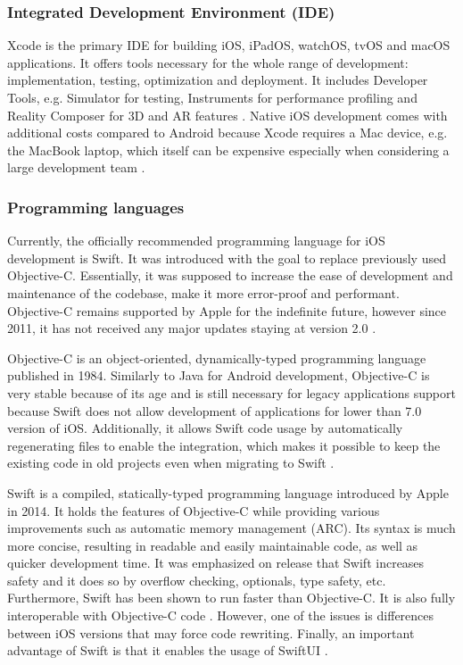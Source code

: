 \subsubsection*{Integrated Development Environment (IDE)}

Xcode is the primary IDE for building iOS, iPadOS, watchOS, tvOS and macOS applications. It offers tools necessary for the whole range of development: implementation, testing, optimization and deployment. It includes Developer Tools, e.g. Simulator for testing, Instruments for performance profiling and Reality Composer for 3D and AR features \cite{xcode_documentation}. Native iOS development comes with additional costs compared to Android because Xcode requires a Mac device, e.g. the MacBook laptop, which itself can be expensive especially when considering a large development team \cite{comparison_technologies_multiplatform,comp_study_hybrid}.

\subsubsection*{Programming languages}

Currently, the officially recommended programming language for iOS development is Swift. It was introduced with the goal to replace previously used Objective-C. Essentially, it was supposed to increase the ease of development and maintenance of the codebase, make it more error-proof and performant. Objective-C remains supported by Apple for the indefinite future, however since 2011, it has not received any major updates staying at version 2.0 \cite{swift_overview,speed_performance_swift_objective_c,swift_vs_objective_c,wiki_objective_c}.

Objective-C is an object-oriented, dynamically-typed programming language published in 1984. Similarly to Java for Android development, Objective-C is very stable because of its age and is still necessary for legacy applications support because Swift does not allow development of applications for lower than 7.0 version of iOS. Additionally, it allows Swift code usage by automatically regenerating files to enable the integration, which makes it possible to keep the existing code in old projects even when migrating to Swift \cite{swift_objective_c_new_language,geeks_objective_c_swift}.

Swift is a compiled, statically-typed programming language introduced by Apple in 2014. It holds the features of Objective-C while providing various improvements such as automatic memory management (ARC). Its syntax is much more concise, resulting in readable and easily maintainable code, as well as quicker development time. It was emphasized on release that Swift increases safety and it does so by overflow checking, optionals, type safety, etc. Furthermore, Swift has been shown to run faster than Objective-C. It is also fully interoperable with Objective-C code \cite{swift_overview,swift_objective_c_new_language,geeks_objective_c_swift}. However, one of the issues is differences between iOS versions that may force code rewriting. Finally, an important advantage of Swift is that it enables the usage of SwiftUI \cite{comparison_technologies_multiplatform}.

